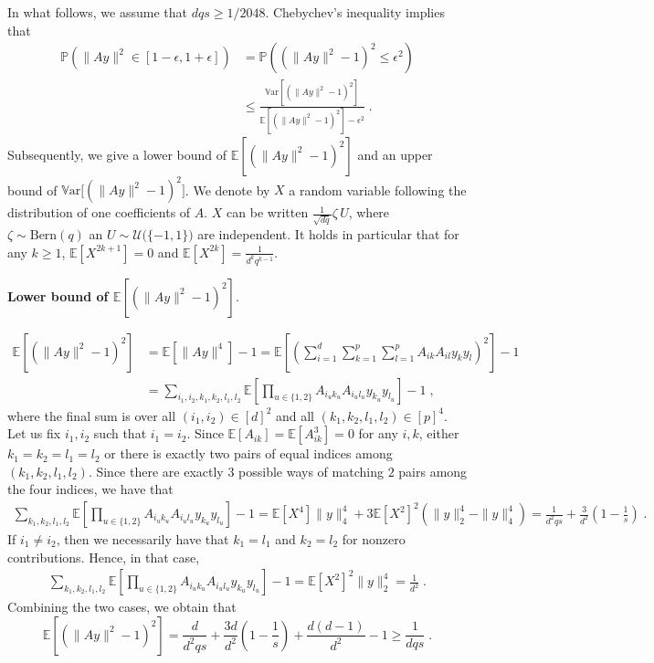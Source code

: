 \documentclass{ps}
\renewcommand{\P}{\mathbb{P}}
\newcommand{\E}{\mathbb{E}}
\newcommand{\Var}{\mathbb{V}\!\mathrm{ar}}
\newcommand{\1}{\mathbbm{1}}
\theoremstyle{plain}
\begin{document}
	In what follows, we assume that $dqs \geq 1/2048$. 
	Chebychev's inequality implies that
	\begin{align*}
		\P(\|Ay\|^2 \in [1-\epsilon, 1+\epsilon])&= \P((\|Ay\|^2 - 1)^2 \leq \epsilon^2) \\
		&\leq \frac{\Var\left[ (\|Ay\|^2 - 1)^2\right]}{\E\left[(\|Ay\|^2 - 1)^2\right] - \epsilon^2} \; .
	\end{align*}
Subsequently, we give a lower bound of $\E[(\|Ay\|^2 - 1)^2]$ and an upper bound of $\Var \big[(\|Ay\|^2 - 1)^2\big]$. We denote by $X$ a random variable following the distribution of one coefficients of $A$. $X$ can be written $\tfrac{1}{\sqrt{dq}}\zeta\, U$, where $\zeta \sim \mathrm{Bern}(q)$ an $U\sim \mathcal{U}\big(\{-1,1\}\big)$ are independent. It holds in particular that for any $k\geq 1$, $\E[X^{2k+1}] = 0$ and $\E[X^{2k}] = \frac{1}{d^kq^{k-1}}$.

\medskip
\noindent
{\bf Lower bound of $\E[(\|Ay\|^2 - 1)^2]$}.


\begin{align*}
	\E\left[(\|Ay\|^2 - 1)^2\right] &= \E\left[\|Ay\|^4\right] - 1 =\E\left[\left(\sum_{i= 1}^d \sum_{k=1}^p \sum_{l=1}^p A_{ik}A_{il}y_ky_l \right)^2\right] - 1 \\
	&=\sum_{i_1,i_2,k_1,k_2,l_1,l_2} \E\left[\prod_{u \in \{1, 2\}} A_{{i_u}{k_u}}A_{{i_u}{l_u}}y_{k_u}y_{l_u}\right]  - 1 \; ,
\end{align*}
where the final sum is over all $(i_1, i_2) \in [d]^2$ and all $(k_1,k_2,l_1,l_2) \in [p]^4$.
Let us fix $i_1, i_2$ such that $i_1 = i_2$. Since $\E[A_{ik}] = \E[A_{ik}^3] = 0$ for any $i,k$, either $k_1=k_2=l_1=l_2$ or there is exactly two pairs of equal indices among $(k_1, k_2, l_1, l_2)$. Since there are exactly $3$ possible ways of matching $2$ pairs among the four indices, we have that
\begin{align*}
	\sum_{k_1,k_2,l_1,l_2} \E\left[\prod_{u \in \{1, 2\}} A_{{i_u}{k_u}}A_{{i_u}{l_u}}y_{k_u}y_{l_u}\right]  - 1 = \E[X^4]\|y\|_4^4 + 3\E[X^2]^2\left(\|y\|_2^4-\|y\|_4^4\right) = \frac{1}{d^2qs} + \frac{3}{d^2}\left(1-\frac{1}{s}\right) \; .
\end{align*}
If $i_1 \neq i_2$, then we necessarily have that $k_1=l_1$ and $k_2=l_2$ for nonzero contributions.
Hence, in that case,
\begin{align*}
	\sum_{k_1,k_2,l_1,l_2} \E\left[\prod_{u \in \{1, 2\}} A_{{i_u}{k_u}}A_{{i_u}{l_u}}y_{k_u}y_{l_u}\right]  - 1 = \E[X^2]^2\|y\|^4_2 = \frac{1}{d^2} \; .
\end{align*}
%
Combining the two cases, we obtain that 
\begin{equation}\label{eq:lb_moment_4}
	\E\left[(\|Ay\|^2 - 1)^2\right] = \frac{d}{d^2qs} + \frac{3d}{d^2}\left(1-\frac{1}{s}\right) + \frac{d(d-1)}{d^2} - 1 \geq \frac{1}{dqs} \; .
\end{equation}
\end{document}
